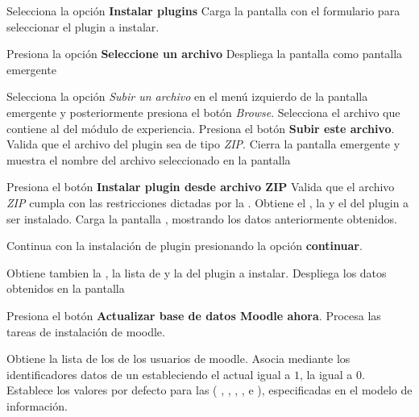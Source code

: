 \begin{UCtrayectoria}%
%

    \Actor Selecciona la opción {\bf Instalar plugins}
    \Sistema Carga la pantalla  con el formulario para seleccionar el
             plugin a instalar. \label{CU-E01-formulario-instalacion}

    \Actor Presiona la opción {\bf Seleccione un archivo}
    \Sistema Despliega la pantalla  como pantalla emergente
             \label{CU-E01-seleccion-archivo}

    \Actor Selecciona la opción {\it Subir un archivo} en el menú izquierdo de la pantalla
           emergente y posteriormente presiona el botón {\it Browse}.
    \Actor Selecciona el archivo que contiene al  del módulo de experiencia.
    \Actor Presiona el botón {\bf Subir este archivo}.
    \Sistema Valida que el archivo del plugin sea de tipo {\it ZIP}. 
    \Sistema Cierra la pantalla emergente y muestra el nombre del archivo seleccionado en la
             pantalla 

    \Actor Presiona el botón {\bf Instalar plugin desde archivo ZIP}
    \Sistema Valida que el archivo {\it ZIP} cumpla con las restricciones dictadas por la
             . 
    \Sistema Obtiene el , la  y el
              del plugin a ser instalado.
    \Sistema Carga la pantalla , mostrando los datos anteriormente obtenidos.

    \Actor Continua con la instalación de plugin presionando la opción {\bf continuar}. 

    \Sistema Obtiene tambien la , la lista de 
             y la  del plugin a instalar. 
             \label{CU-E01-comprobacion}
    \Sistema Despliega los datos obtenidos en la pantalla 

    \Actor Presiona el botón {\bf Actualizar base de datos Moodle ahora}. 
    \Sistema Procesa las tareas de instalación de moodle.

    \Sistema Obtiene la lista de los  de los
             usuarios de moodle.
    \Sistema Asocia mediante los identificadores datos de un 
             estableciendo el  actual igual a $1$,
             la  igual a $0$.
    \Sistema Establece los valores por defecto para las  (
              ,
              ,
              ,
              ,
               e
              ), especificadas en el modelo de información.


\end{UCtrayectoria}
